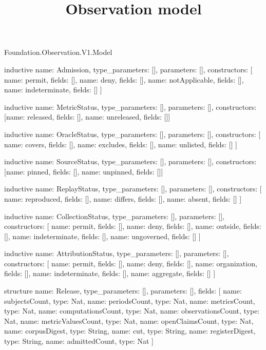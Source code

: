 \begin{lexlean}{Foundation.Observation.V1.Model}
\title{Observation model}
\begin{semanticmodule}
inductive{
  name: Admission,
  type_parameters: [],
  parameters: [],
  constructors: [
    {name: permit, fields: []},
    {name: deny, fields: []},
    {name: notApplicable, fields: []},
    {name: indeterminate, fields: []}
  ]
}

inductive{
  name: MetricStatus,
  type_parameters: [],
  parameters: [],
  constructors: [{name: released, fields: []}, {name: unreleased, fields: []}]
}

inductive{
  name: OracleStatus,
  type_parameters: [],
  parameters: [],
  constructors: [
    {name: covers, fields: []},
    {name: excludes, fields: []},
    {name: unlisted, fields: []}
  ]
}

inductive{
  name: SourceStatus,
  type_parameters: [],
  parameters: [],
  constructors: [{name: pinned, fields: []}, {name: unpinned, fields: []}]
}

inductive{
  name: ReplayStatus,
  type_parameters: [],
  parameters: [],
  constructors: [
    {name: reproduced, fields: []},
    {name: differs, fields: []},
    {name: absent, fields: []}
  ]
}

inductive{
  name: CollectionStatus,
  type_parameters: [],
  parameters: [],
  constructors: [
    {name: permit, fields: []},
    {name: deny, fields: []},
    {name: outside, fields: []},
    {name: indeterminate, fields: []},
    {name: ungoverned, fields: []}
  ]
}

inductive{
  name: AttributionStatus,
  type_parameters: [],
  parameters: [],
  constructors: [
    {name: permit, fields: []},
    {name: deny, fields: []},
    {name: organization, fields: []},
    {name: indeterminate, fields: []},
    {name: aggregate, fields: []}
  ]
}

structure{
  name: Release,
  type_parameters: [],
  parameters: [],
  fields: [
    {name: subjectsCount, type: Nat},
    {name: periodsCount, type: Nat},
    {name: metricsCount, type: Nat},
    {name: computationsCount, type: Nat},
    {name: observationsCount, type: Nat},
    {name: metricValuesCount, type: Nat},
    {name: openClaimsCount, type: Nat},
    {name: corpusDigest, type: String},
    {name: cut, type: String},
    {name: registerDigest, type: String},
    {name: admittedCount, type: Nat}
  ]
}


\end{semanticmodule}
\end{lexlean}
